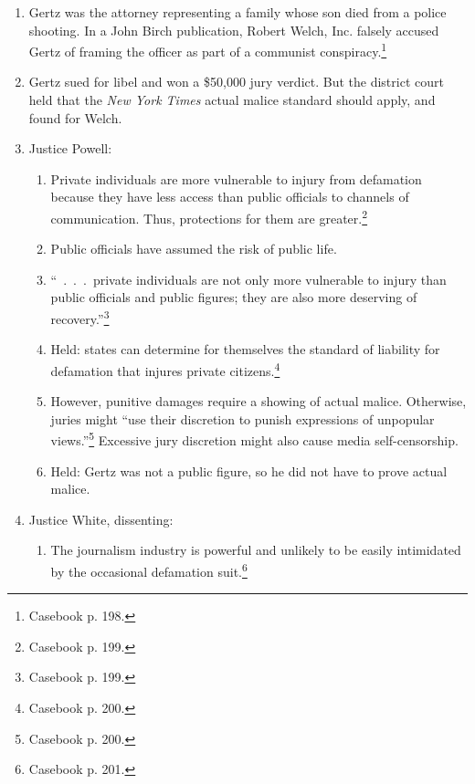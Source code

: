 \begin{enumerate}
    \item Gertz was the attorney representing a family whose son died from a 
    police shooting. In a John Birch publication, Robert Welch, Inc. falsely 
    accused Gertz of framing the officer as part of a communist 
    conspiracy.\footnote{Casebook p. 198.}
    \item Gertz sued for libel and won a \$50,000 jury verdict. But the district 
    court held that the \emph{New York Times} actual malice standard should 
    apply, and found for Welch.
    \item Justice Powell:
    \begin{enumerate}
        \item Private individuals are more vulnerable to injury from defamation 
        because they have less access than public officials to channels of 
        communication. Thus, protections for them are greater.\footnote{Casebook 
        p. 199.}
        \item Public officials have assumed the risk of public life.
        \item ``~.~.~.~private individuals are not only more vulnerable to 
        injury than public officials and public figures; they are also more 
        deserving of recovery.''\footnote{Casebook p. 199.}
        \item Held: states can determine for themselves the standard of 
        liability for defamation that injures private 
        citizens.\footnote{Casebook p. 200.}
        \item However, punitive damages require a showing of actual malice. 
        Otherwise, juries might ``use their discretion to punish expressions of 
        unpopular views.''\footnote{Casebook p. 200.} Excessive jury discretion 
        might also cause media self-censorship.
        \item Held: Gertz was not a public figure, so he did not have to prove 
        actual malice.
    \end{enumerate}
    \item Justice White, dissenting:
    \begin{enumerate}
        \item The journalism industry is powerful and unlikely to be easily 
        intimidated by the occasional defamation suit.\footnote{Casebook p. 
        201.}
    \end{enumerate}
\end{enumerate}

